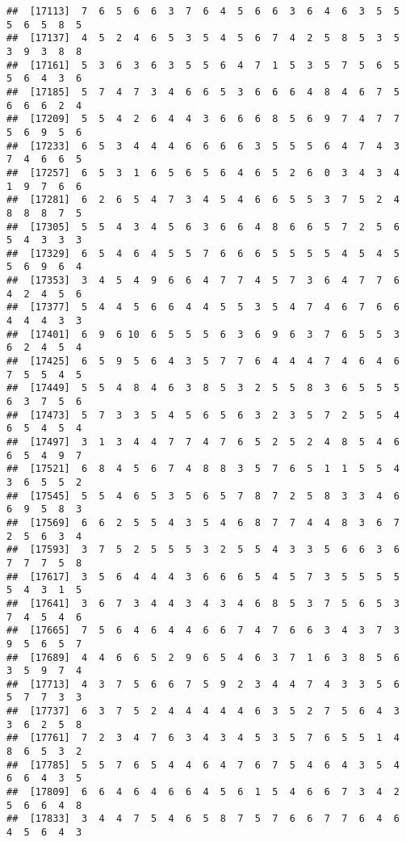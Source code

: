 \documentclass[
]{book}
\begin{document}
\begin{verbatim}
##  [17113]  7  6  5  6  6  3  7  6  4  5  6  6  3  6  4  6  3  5  5  5  6  5  8  5
##  [17137]  4  5  2  4  6  5  3  5  4  5  6  7  4  2  5  8  5  3  5  3  9  3  8  8
##  [17161]  5  3  6  3  6  3  5  5  6  4  7  1  5  3  5  7  5  6  5  5  6  4  3  6
##  [17185]  5  7  4  7  3  4  6  6  5  3  6  6  6  4  8  4  6  7  5  6  6  6  2  4
##  [17209]  5  5  4  2  6  4  4  3  6  6  6  8  5  6  9  7  4  7  7  5  6  9  5  6
##  [17233]  6  5  3  4  4  4  6  6  6  6  3  5  5  5  6  4  7  4  3  7  4  6  6  5
##  [17257]  6  5  3  1  6  5  6  5  6  4  6  5  2  6  0  3  4  3  4  1  9  7  6  6
##  [17281]  6  2  6  5  4  7  3  4  5  4  6  6  5  5  3  7  5  2  4  8  8  8  7  5
##  [17305]  5  5  4  3  4  5  6  3  6  6  4  8  6  6  5  7  2  5  6  5  4  3  3  3
##  [17329]  6  5  4  6  4  5  5  7  6  6  6  5  5  5  5  4  5  4  5  5  6  9  6  4
##  [17353]  3  4  5  4  9  6  6  4  7  7  4  5  7  3  6  4  7  7  6  4  2  4  5  6
##  [17377]  5  4  4  5  6  6  4  4  5  5  3  5  4  7  4  6  7  6  6  4  4  4  3  3
##  [17401]  6  9  6 10  6  5  5  5  6  3  6  9  6  3  7  6  5  5  3  6  2  4  5  4
##  [17425]  6  5  9  5  6  4  3  5  7  7  6  4  4  4  7  4  6  4  6  7  5  5  4  5
##  [17449]  5  5  4  8  4  6  3  8  5  3  2  5  5  8  3  6  5  5  5  6  3  7  5  6
##  [17473]  5  7  3  3  5  4  5  6  5  6  3  2  3  5  7  2  5  5  4  6  5  4  5  4
##  [17497]  3  1  3  4  4  7  7  4  7  6  5  2  5  2  4  8  5  4  6  6  5  4  9  7
##  [17521]  6  8  4  5  6  7  4  8  8  3  5  7  6  5  1  1  5  5  4  3  6  5  5  2
##  [17545]  5  5  4  6  5  3  5  6  5  7  8  7  2  5  8  3  3  4  6  6  9  5  8  3
##  [17569]  6  6  2  5  5  4  3  5  4  6  8  7  7  4  4  8  3  6  7  2  5  6  3  4
##  [17593]  3  7  5  2  5  5  5  3  2  5  5  4  3  3  5  6  6  3  6  7  7  7  5  8
##  [17617]  3  5  6  4  4  4  3  6  6  6  5  4  5  7  3  5  5  5  5  5  4  3  1  5
##  [17641]  3  6  7  3  4  4  3  4  3  4  6  8  5  3  7  5  6  5  3  7  4  5  4  6
##  [17665]  7  5  6  4  6  4  4  6  6  7  4  7  6  6  3  4  3  7  3  9  5  6  5  7
##  [17689]  4  4  6  6  5  2  9  6  5  4  6  3  7  1  6  3  8  5  6  3  5  9  7  4
##  [17713]  4  3  7  5  6  6  7  5  9  2  3  4  4  7  4  3  3  5  6  5  7  7  3  3
##  [17737]  6  3  7  5  2  4  4  4  4  4  6  3  5  2  7  5  6  4  3  3  6  2  5  8
##  [17761]  7  2  3  4  7  6  3  4  3  4  5  3  5  7  6  5  5  1  4  8  6  5  3  2
##  [17785]  5  5  7  6  5  4  4  6  4  7  6  7  5  4  6  4  3  5  4  6  6  4  3  5
##  [17809]  6  6  4  6  4  6  6  4  5  6  1  5  4  6  6  7  3  4  2  5  6  6  4  8
##  [17833]  3  4  4  7  5  4  6  5  8  7  5  7  6  6  7  7  6  4  6  4  5  6  4  3

\end{verbatim}
\end{document}
